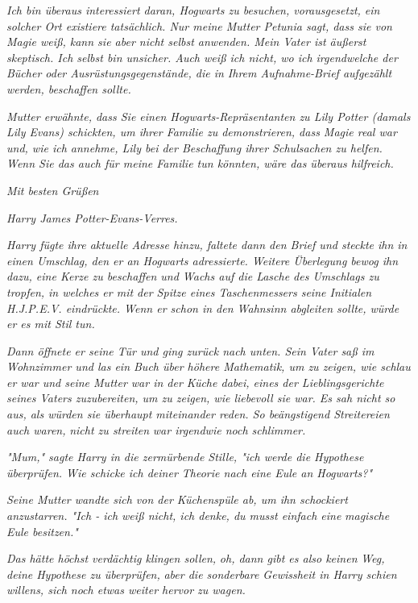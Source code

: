 {\emph{Ich bin überaus interessiert daran, Hogwarts zu besuchen, vorausgesetzt, ein solcher Ort existiere tatsächlich. Nur meine Mutter Petunia sagt, dass sie von Magie weiß, kann sie aber nicht selbst anwenden. Mein Vater ist äußerst skeptisch. Ich selbst bin unsicher. Auch weiß ich nicht, wo ich irgendwelche der Bücher oder Ausrüstungsgegenstände, die in Ihrem Aufnahme-Brief aufgezählt werden, beschaffen sollte.}

\emph{Mutter erwähnte, dass Sie einen Hogwarts-Repräsentanten zu Lily Potter (damals Lily Evans) schickten, um ihrer Familie zu demonstrieren, dass Magie real war und, wie ich annehme, Lily bei der Beschaffung ihrer Schulsachen zu helfen. Wenn Sie das auch für meine Familie tun könnten, wäre das überaus hilfreich.}

\emph{Mit besten Grüßen}

\emph{Harry James Potter-Evans-Verres.}

\emph{Harry fügte ihre aktuelle Adresse hinzu, faltete dann den Brief und steckte ihn in einen Umschlag, den er an Hogwarts adressierte. Weitere Überlegung bewog ihn dazu, eine Kerze zu beschaffen und Wachs auf die Lasche des Umschlags zu tropfen, in welches er mit der Spitze eines Taschenmessers seine Initialen H.J.P.E.V. eindrückte. Wenn er schon in den Wahnsinn abgleiten sollte, würde er es mit Stil tun.}

\emph{Dann öffnete er seine Tür und ging zurück nach unten. Sein Vater saß im Wohnzimmer und las ein Buch über höhere Mathematik, um zu zeigen, wie schlau er war und seine Mutter war in der Küche dabei, eines der Lieblingsgerichte seines Vaters zuzubereiten, um zu zeigen, wie liebevoll sie war. Es sah nicht so aus, als würden sie überhaupt miteinander reden. So beängstigend Streitereien auch waren,} \emph{\emph{nicht zu streiten}} \emph{war irgendwie noch schlimmer.}

\emph{"Mum," sagte Harry in die zermürbende Stille, "ich werde die Hypothese überprüfen. Wie schicke ich deiner Theorie nach eine Eule an Hogwarts?"}

\emph{Seine Mutter wandte sich von der Küchenspüle ab, um ihn schockiert anzustarren. "Ich - ich weiß nicht, ich denke, du musst einfach eine} \emph{magische Eule besitzen."}

\emph{Das hätte höchst verdächtig klingen sollen,} \emph{\emph{oh, dann gibt es also keinen}} \emph{\emph{Weg, deine Hypothese zu überprüfen,}} \emph{aber die sonderbare Gewissheit in Harry schien willens, sich noch etwas weiter hervor zu wagen.}

}
